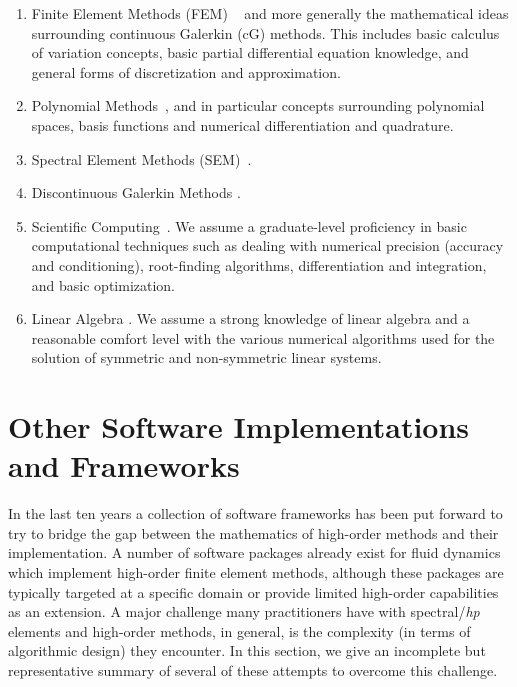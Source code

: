 \begin{enumerate}
\item Finite Element Methods (FEM) ~\cite{Hughes87,Schwab,BaSzKa81} and more generally the mathematical ideas 
surrounding continuous Galerkin (cG) methods.  This includes basic calculus of variation concepts, basic
partial differential equation knowledge, and general forms of discretization and approximation.

\item Polynomial Methods~\cite{CanutoHQZ87,Funaro92,HGG}, and in particular concepts surrounding polynomial
spaces, basis functions and numerical differentiation and quadrature.

\item Spectral Element Methods (SEM)~\cite{DevilleFM02,KaSh05}.

\item Discontinuous Galerkin Methods \cite{CockburnKS,HesthavenW08}.

\item Scientific Computing~\cite{Heath,KarniadakisK03}.  We assume a graduate-level proficiency in basic
computational techniques such as dealing with numerical precision (accuracy and conditioning), root-finding algorithms,
differentiation and integration, and basic optimization.

\item Linear Algebra \cite{TrefethenB97,Demmel97}.  We assume a strong knowledge of linear algebra and a reasonable 
comfort level with the various numerical algorithms used for the solution of symmetric and non-symmetric linear systems.
\end{enumerate}

\section{Other Software Implementations and Frameworks}

In the last ten years a collection of software frameworks has been put forward to try to bridge the gap between the 
mathematics of high-order methods and their implementation. 
A number of software packages already exist for fluid dynamics which implement
high-order finite element methods, although these packages are typically targeted at a specific
domain or provide limited high-order capabilities as an extension.
A major challenge many practitioners have with
spectral/{\em hp\/} elements and high-order methods, in general, is the complexity (in terms of algorithmic design) they
encounter. In this section, we give an incomplete but
representative summary of several of these attempts to overcome this challenge.

